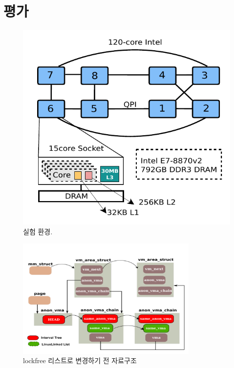 \newpage

\section{평가}
\label{sec:evaluation}
\begin{figure}[h!]
  \begin{center}
    \includegraphics[scale=1.2]{fig/xeon}
  \end{center}
  \caption{실험 환경.}
  \label{fig:xeon}
\end{figure}


 
 \begin{figure}[h]
    \centering
    \includegraphics[width=0.8\textwidth]{fig/lockfree}
    \caption{lockfree 리스트로 변경하기 전 자료구조}
  \label{fig:lockfree}
\end{figure}
 
